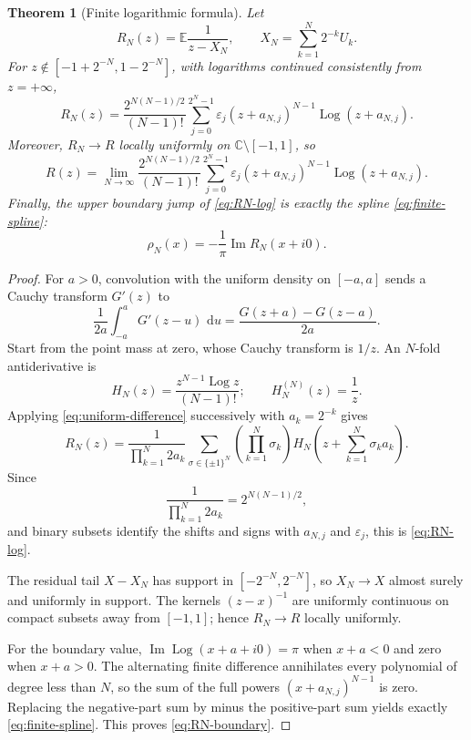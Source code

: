 \documentclass[11pt]{article}
\newtheorem{theorem}{Theorem}[section]
\theoremstyle{definition}
\theoremstyle{remark}
\newcommand{\C}{\mathbb C}
\newcommand{\E}{\mathbb E}
\newcommand{\dd}{\,\mathrm d}
\newcommand{\eps}{\varepsilon}
\newcommand{\Log}{\operatorname{Log}}
\begin{document}
\begin{theorem}[Finite logarithmic formula]\label{thm:finite-log}
Let
\[
 R_N(z)=\E\frac1{z-X_N},
 \qquad X_N=\sum_{k=1}^{N}2^{-k}U_k.
\]
For \(z\notin[-1+2^{-N},1-2^{-N}]\), with logarithms continued consistently from
\(z=+\infty\),
\begin{equation}
 \boxed{
 R_N(z)=\frac{2^{N(N-1)/2}}{(N-1)!}
 \sum_{j=0}^{2^N-1}\eps_j
 (z+a_{N,j})^{N-1}\Log(z+a_{N,j}).
 }                                                           \label{eq:RN-log}
\end{equation}
Moreover, \(R_N\to R\) locally uniformly on \(\C\setminus[-1,1]\), so
\begin{equation}
 R(z)=\lim_{N\to\infty}\frac{2^{N(N-1)/2}}{(N-1)!}
 \sum_{j=0}^{2^N-1}\eps_j
 (z+a_{N,j})^{N-1}\Log(z+a_{N,j}).                           \label{eq:R-log-limit}
\end{equation}
Finally, the upper boundary jump of \eqref{eq:RN-log} is exactly the spline
\eqref{eq:finite-spline}:
\begin{equation}
 \rho_N(x)=-\frac1\pi\operatorname{Im}R_N(x+i0).
                                                                    \label{eq:RN-boundary}
\end{equation}
\end{theorem}

\begin{proof}
For \(a>0\), convolution with the uniform density on \([-a,a]\) sends a Cauchy transform
\(G'(z)\) to
\begin{equation}
 \frac1{2a}\int_{-a}^{a}G'(z-u)\,\dd u
 =\frac{G(z+a)-G(z-a)}{2a}.                                  \label{eq:uniform-difference}
\end{equation}
Start from the point mass at zero, whose Cauchy transform is \(1/z\).  An \(N\)-fold
antiderivative is
\[
 H_N(z)=\frac{z^{N-1}\Log z}{(N-1)!};
 \qquad H_N^{(N)}(z)=\frac1z.
\]
Applying \eqref{eq:uniform-difference} successively with \(a_k=2^{-k}\) gives
\[
 R_N(z)=\frac{1}{\prod_{k=1}^{N}2a_k}
 \sum_{\sigma\in\{\pm1\}^N}
 \left(\prod_{k=1}^{N}\sigma_k\right)
 H_N\!\left(z+\sum_{k=1}^{N}\sigma_k a_k\right).
\]
Since
\[
 \frac1{\prod_{k=1}^{N}2a_k}=2^{N(N-1)/2},
\]
and binary subsets identify the shifts and signs with \(a_{N,j}\) and \(\eps_j\), this is
\eqref{eq:RN-log}.

The residual tail \(X-X_N\) has support in \([-2^{-N},2^{-N}]\), so \(X_N\to X\)
almost surely and uniformly in support.  The kernels \((z-x)^{-1}\) are uniformly
continuous on compact subsets away from \([-1,1]\); hence \(R_N\to R\) locally uniformly.

For the boundary value, \(\operatorname{Im}\Log(x+a+i0)=\pi\) when \(x+a<0\) and zero
when \(x+a>0\).  The alternating finite difference annihilates every polynomial of degree
less than \(N\), so the sum of the full powers \((x+a_{N,j})^{N-1}\) is zero.  Replacing the
negative-part sum by minus the positive-part sum yields exactly
\eqref{eq:finite-spline}.  This proves \eqref{eq:RN-boundary}.
\end{proof}
\end{document}
